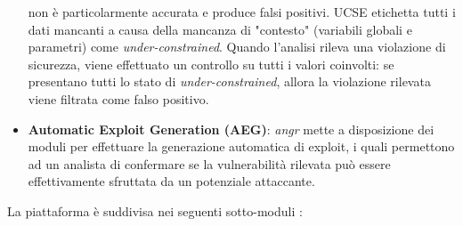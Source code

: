 \documentclass[../main.tex]{subfiles}
\begin{document}
\begin{itemize}
    non è particolarmente accurata e produce falsi positivi. UCSE etichetta tutti i dati mancanti a causa della mancanza di "contesto" (variabili globali e parametri) come \textit{under-constrained}. Quando l'analisi rileva una violazione di sicurezza, viene effettuato un controllo su tutti i valori coinvolti: se presentano tutti lo stato di \textit{under-constrained},
    allora la violazione rilevata viene filtrata come falso positivo.
    \item \textbf{Automatic Exploit Generation (AEG)}: \textit{angr} mette a disposizione dei moduli per effettuare la generazione automatica di exploit, i quali permettono ad un analista di confermare se la vulnerabilità rilevata può essere effettivamente sfruttata da un potenziale attaccante.
\end{itemize}
\newpage \noindent
La piattaforma è suddivisa nei seguenti sotto-moduli \cite{angr_introductory_paper}:
\end{document}

